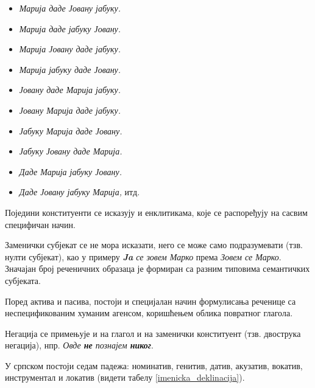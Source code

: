 \begin{multicols}{2}
\begin{itemize}
 \item \textit{Марија даде Јовану јабуку.}
 \item \textit{Марија даде јабуку Јовану.} 
 \item \textit{Марија Јовану даде јабуку.} 
 \item \textit{Марија јабуку даде Јовану.}
 \item \textit{Јовану даде Марија јабуку.}
 \item \textit{Јовану Марија даде јабуку.}
 \item \textit{Јабуку Марија даде Јовану.}
 \item \textit{Јабуку Јовану даде Марија.}
 \item \textit{Даде Марија јабуку Јовану.} 
 \item \textit{Даде Јовану јабуку Марија,} итд.
\end{itemize}
Поједини конституенти се исказују и енклитикама, које се распоређују на сасвим специфичан начин.

Заменички субјекат се не мора исказати, него се може само подразумевати (тзв. нулти субјекат), као у примеру \textit{\textbf{Ja} се зовем Марко} према \textit{Зовем се Марко}. Значајан број реченичних образаца је формиран са разним типовима семантичких субјеката.

Поред актива и пасива, постоји и специјалан начин формулисања реченице са неспецификованим хуманим агенсом, коришћењем облика повратног глагола.

Негација се примењује и на глагол и на заменички конституент (тзв. двострука негација), нпр. \textit{Овде \textbf{не} познајем \textbf{никог}}.

У српском постоји седам падежа: номинатив, генитив, датив, акузатив, вокатив, инструментал и локатив (видети табелу \ref{imenicka_deklinacija}). 


\end{multicols}
